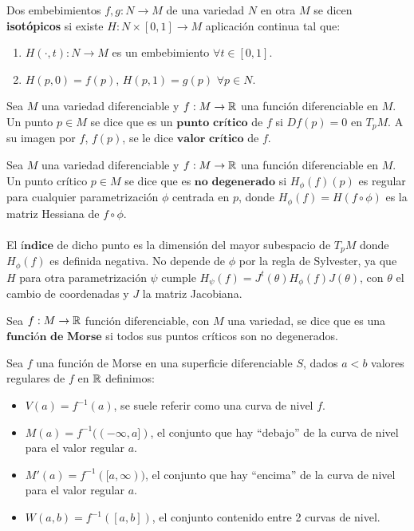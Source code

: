 \begin{definicion} Dos embebimientos $f,g : N \rightarrow M$ de una variedad $N$ en otra $M$ se dicen \textbf{isotópicos} si existe $H: N \times [0,1] \rightarrow M$ aplicación continua tal que:
	\begin{enumerate}
		\item $H(\cdot, t) : N \rightarrow M$ es un embebimiento $\forall t \in [0,1]$.
		\item $H(p, 0) = f(p)$, $H(p, 1) = g(p)$ $\forall p \in N$.
	\end{enumerate}
\end{definicion}

\begin{definicion} Sea $M$ una variedad diferenciable y $f: M \rightarrow \mathbb{R}$ una función diferenciable en $M$. Un punto $p \in M$ se dice que es un $\textbf{punto crítico}$ de $f$ si $Df(p) = 0$ en $T_pM$. A su imagen por $f$, $f(p)$, se le dice $\textbf{valor crítico}$ de $f$.
\end{definicion}

\begin{definicion} Sea $M$ una variedad diferenciable y $f: M \rightarrow \mathbb{R}$ una función diferenciable en $M$. Un punto crítico $p \in M$ se dice que es $\textbf{no degenerado}$ si $H_\phi(f)(p)$ es regular para cualquier parametrización $\phi$ centrada en $p$, donde $H_\phi(f)=H(f \circ \phi)$ es la matriz Hessiana de $f \circ \phi$.\\ 
\\ El $\textbf{índice}$ de dicho punto es la dimensión del mayor subespacio de $T_pM$ donde $H_\phi(f)$ es definida negativa. No depende de $\phi$ por la regla de Sylvester, ya que $H$ para otra parametrización $\psi$ cumple $H_\psi(f) = J^t(\theta) H_\phi(f) J(\theta)$, con $\theta$ el cambio de coordenadas y $J$ la matriz Jacobiana.
\end{definicion}

\begin{definicion} Sea $f:M \to \mathbb{R}$ función diferenciable, con $M$ una variedad, se dice que es una $\textbf{función de Morse}$ si todos sus puntos críticos son no degenerados.
\end{definicion}

\newpage
\begin{definicion} Sea $f$ una función de Morse en una superficie diferenciable $S$, dados $a < b$ valores regulares de $f$ en $\mathbb{R}$ definimos:
	\begin{itemize}
		\item $V(a) = f^{-1}(a)$, se suele referir como una curva de nivel $f$.
		\item $M(a) = f^{-1}((-\infty, a])$, el conjunto que hay ``debajo'' de la curva de nivel para el valor regular $a$.
		\item $M'(a) = f^{-1}([a,\infty))$, el conjunto que hay ``encima'' de la curva de nivel para el valor regular $a$.
		\item $W(a,b) = f^{-1}([a,b])$, el conjunto contenido entre 2 curvas de nivel.
	\end{itemize}
\end{definicion}

